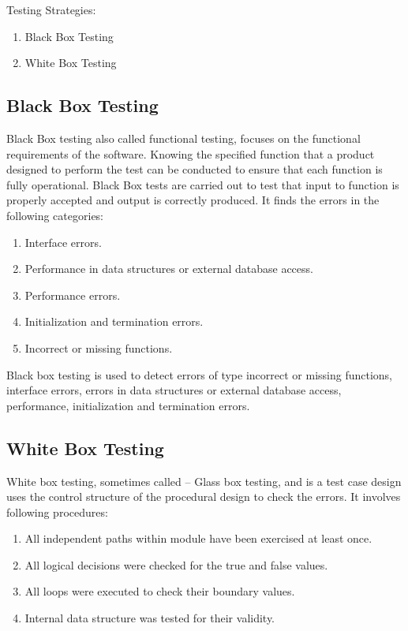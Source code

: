 \documentclass[11pt]{report} %
\begin{document}
Testing Strategies: 
\begin{enumerate}
	\item Black Box Testing
	\item White Box Testing
\end{enumerate}

\subsection{Black Box Testing}
\label{subsec:Black Box Testing}

Black Box testing also called functional testing, focuses on the functional requirements of the software. Knowing the specified function that a product designed to perform the test can be conducted to ensure that each function is fully operational. Black Box tests are carried out to test that input to function is properly accepted and output is correctly produced. It finds the errors in the following categories:

\begin{enumerate}
	\item Interface errors.
	\item Performance in data structures or external database access.
	\item Performance errors.
	\item Initialization and termination errors.
	\item Incorrect or missing functions.
\end{enumerate}

Black box testing is used to detect errors of type incorrect or missing functions, interface errors, errors in data structures or external database access, performance, initialization and termination errors. 

\subsection{White Box Testing}
\label{subsec:White Box Testing}

White box testing, sometimes called -- Glass box testing, and is a test case design uses the control structure of the procedural design to check the errors. It involves following procedures: 

\begin{enumerate}
	\item All independent paths within module have been exercised at least once.
	\item All logical decisions were checked for the true and false values.
	\item All loops were executed to check their boundary values. 
	\item Internal data structure was tested for their validity. 
\end{enumerate}
\end{document}
